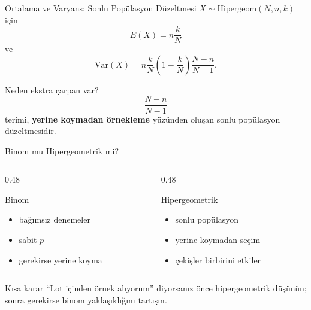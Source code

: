 \documentclass[light]{lutbeamer}
\begin{document}
\begin{frame}{Ortalama ve Varyans: Sonlu Popülasyon Düzeltmesi}
    \small
    \(X \sim \text{Hipergeom}(N,n,k)\) için
    \[
    E(X)=n\frac{k}{N}
    \]
    ve
    \[
    \mathrm{Var}(X)=n\frac{k}{N}\left(1-\frac{k}{N}\right)\frac{N-n}{N-1}.
    \]

    \begin{alertblock}{Neden ekstra çarpan var?}
        \[
        \frac{N-n}{N-1}
        \]
        terimi, \textbf{yerine koymadan örnekleme} yüzünden oluşan sonlu popülasyon düzeltmesidir.
    \end{alertblock}
\end{frame}

\begin{frame}{Binom mu Hipergeometrik mi?}
    \small
    \begin{columns}[T]
        \begin{column}{0.48\textwidth}
            \begin{block}{Binom}
                \begin{itemize}
                    \item bağımsız denemeler
                    \item sabit \(p\)
                    \item gerekirse yerine koyma
                \end{itemize}
            \end{block}
        \end{column}
        \begin{column}{0.48\textwidth}
            \begin{block}{Hipergeometrik}
                \begin{itemize}
                    \item sonlu popülasyon
                    \item yerine koymadan seçim
                    \item çekişler birbirini etkiler
                \end{itemize}
            \end{block}
        \end{column}
    \end{columns}

    \begin{exampleblock}{Kısa karar}
        ``Lot içinden örnek alıyorum'' diyorsanız önce hipergeometrik düşünün; sonra gerekirse binom yaklaşıklığını tartışın.
    \end{exampleblock}
\end{frame}
\end{document}
